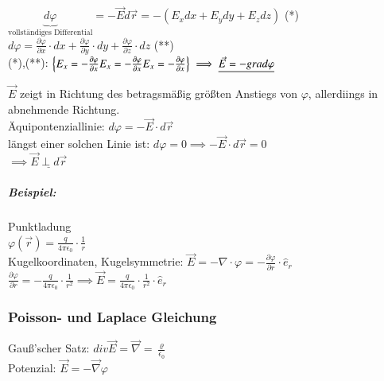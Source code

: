 \documentclass[11pt]{article}
\begin{document}
$ \underbrace{d\varphi}_{\text{vollständiges Differential}}= -\vec{E}d\vec{r} = - (E_xdx+E_ydy+E_zdz)$ (*) \\

$ d\varphi=\frac{\partial\varphi}{\partial x}\cdot dx +\frac{\partial\varphi}{\partial y}\cdot dy+\frac{\partial\varphi}{\partial z}\cdot dz $ (**)\\

(*),(**): \begin{math}
\left\{ E_x= -\frac{\partial\varphi}{\partial x}\\ E_x= -\frac{\partial\varphi}{\partial x}\\ E_x= -\frac{\partial\varphi}{\partial x}  \right\} \implies \underline{\vec{E}=-grad\varphi}\\ \end{math}  

$\vec{E}$ zeigt in Richtung des betragsmä\ss{}ig grö\ss{}ten Anstiegs von $\varphi$, allerdiings in abnehmende Richtung.\\

Äquipontenziallinie: $ d\varphi= -\vec{E}\cdot d\vec{r} $\\
längst einer solchen Linie ist: $ d\varphi=0\implies -\vec{E}\cdot d\vec{r}=0 $\\
$ \implies \underline{\vec{E}\perp d\vec{r}} $\\


\subparagraph{Beispiel:} Punktladung\\

$ \varphi(\vec{r})=\frac{q}{4\pi\epsilon_0}\cdot \frac{1}{r} $\\

Kugelkoordinaten, Kugelsymmetrie: $ \vec{E}=-\nabla\cdot\varphi=-\frac{\partial\varphi}{\partial r}\cdot \hat{e}_r $\\

$ \frac{\partial\varphi}{\partial r}=-\frac{q}{4\pi\epsilon_0}\cdot\frac{1}{r^2} \implies \vec{E}=\frac{q}{4\pi\epsilon_0}\cdot \frac{1}{r^2}\cdot\hat{e}_r$\\

\subsubsection{Poisson- und Laplace Gleichung}

Gau\ss{}'scher Satz: $div\vec{E}=\vec{\nabla}=\frac{\varrho}{\epsilon_0}$\\
Potenzial: $\vec{E}=-\vec{\nabla}\varphi$\\
\end{document}
